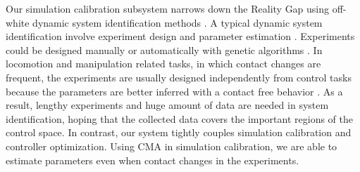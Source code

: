 Our simulation calibration subsystem narrows down the Reality Gap using off-white dynamic system identification methods \cite{ljung:2010}. A typical dynamic system identification involve experiment design and parameter estimation \cite{swevers:2007}. Experiments could be designed manually or automatically with genetic algorithms \cite{BongardL05}. In locomotion and manipulation related tasks, in which contact changes are frequent, the experiments are usually designed independently from control tasks because the parameters are better inferred with a contact free behavior \cite{Kolev:2015}. As a result, lengthy experiments and huge amount of data are needed in system identification, hoping that the collected data covers the important regions of the control space. In contrast, our system tightly couples simulation calibration and controller optimization. Using CMA in simulation calibration, we are able to estimate parameters even when contact changes in the experiments. 

